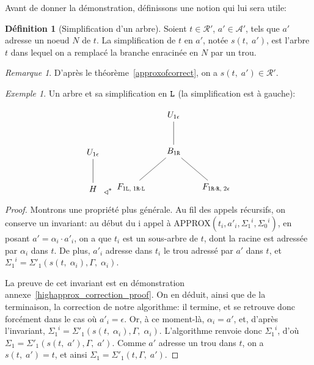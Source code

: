 \documentclass[11pt,a4paper]{article}
\theoremstyle{plain}
\theoremstyle{definition}
\newtheorem{definition}{Définition}
\theoremstyle{remark}
\newtheorem{remark}{Remarque}
\newtheorem{example}{Exemple}
\newcommand*{\sequent}{\Gamma}
\newcommand*{\Left}{\textnormal{\texttt{L}}}
\newcommand*{\Right}{\textnormal{\texttt{R}}}
\newcommand*{\treeaddresses}{\ensuremath{\mathcal{A'}}}
\newcommand*{\representationspartial}{\ensuremath{\mathcal{R'}}}
\newcommand*{\relapprox}{\ensuremath{\triangleleft}}
\newcommand*{\relapproxlarge}{\ensuremath{\relapprox^*}}
\newcommand*{\unknown}{H}
\newcommand*{\lowapprox}{\ensuremath{\Sigma_0}}
\newcommand*{\highapprox}{\ensuremath{\Sigma_1}}
\newcommand*{\highapproxspec}{\ensuremath{\Sigma'_1}}
\newcommand*{\treesimplify}{\ensuremath{s}}
\begin{document}
Avant de donner la démonstration, définissons une notion qui lui sera utile:

\begin{definition}[Simplification d'un arbre]
    Soient $t \in \representationspartial$, $a' \in \treeaddresses$, tels que $a'$ adresse un noeud $N$ de $t$. La simplification de $t$ en $a'$, notée $\treesimplify(t, \; a')$, est l'arbre $t$ dans lequel on a remplacé la branche enracinée en $N$ par un trou. 
\end{definition}

\begin{remark}
    D'après le théorème~\ref{approxofcorrect}, on a $\treesimplify(t, \; a') \in \representationspartial$.
\end{remark}

\begin{example}
    Un arbre et sa simplification en $\Left$ (la simplification est à gauche):

        \begin{equation*}
        \begin{tikzpicture}%
            [level 2/.style={sibling distance=3.5cm}]
            \node {$U_{1 \epsilon}$}
            child {node {$\unknown$}
            };
        \end{tikzpicture}
        \relapproxlarge
        \begin{tikzpicture}%
            [level 2/.style={sibling distance=3.5cm}]
            \node {$U_{1 \epsilon}$}
            child {node {$B_{1 \Right}$}
                child {node {$F_{1 \Left, \; 1 \Right \cdot \Left}$}}
                child {node {$F_{1 \Right \cdot \Right, \; 2 \epsilon}$}}
            };
        \end{tikzpicture}
    \end{equation*}
\end{example}

\begin{proof}
    Montrons une propriété plus générale. Au fil des appels récursifs, on conserve un invariant: au début du i\ieme{} appel à APPROX$(t_i, a'_i, {\highapprox}^i, {\lowapprox}^i)$, en posant $a' = {\alpha}_i \cdot a'_i$, on a que $t_i$ est un sous-arbre de $t$, dont la racine est adressée par ${\alpha}_i$ dans $t$. De plus, $a'_i$ adresse dans $t_i$ le trou adressé par $a'$ dans $t$, et ${\highapprox}^i = \highapproxspec \left( \treesimplify( t, \; {\alpha}_i ), \sequent, \; {\alpha}_i \right)$.

    La preuve de cet invariant est en démonstration annexe~\ref{highapprox_correction_proof}. On en déduit, ainsi que de la terminaison, la correction de notre algorithme: il termine, et se retrouve donc forcément dans le cas où $a'_i = \epsilon$. Or, à ce moment-là, $\alpha_i = a'$, et, d'après l'invariant, ${\highapprox}^i = \highapproxspec \left( \treesimplify( t, \; {\alpha}_i ), \sequent, \; {\alpha}_i \right)$. L'algorithme renvoie donc ${\highapprox}^i$, d'où $\highapprox = \highapproxspec \left( \treesimplify( t, \; a' ), \sequent, \; a' \right)$. Comme $a'$ adresse un trou dans $t$, on a $\treesimplify( t, \; a' ) = t$, et ainsi $\highapprox = \highapproxspec \left( t, \sequent, \; a' \right)$.
\end{proof}
\end{document}
